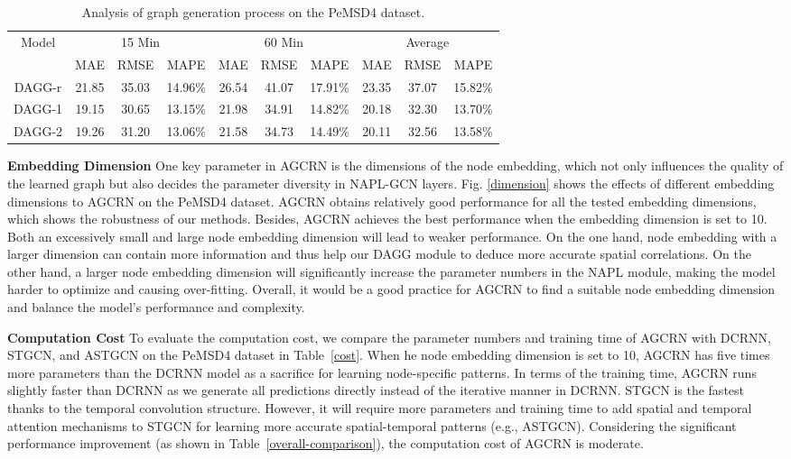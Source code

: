 \documentclass{article}
\begin{document}
\begin{table}[h]
\centering
\caption{Analysis of graph generation process on the PeMSD4 dataset. }
\label{graph-generation}
\begin{tabular}{@{}cccccccccc@{}}
\toprule
\multirow{2}{*}{Model} & \multicolumn{3}{c}{15 Min} & \multicolumn{3}{c}{60 Min} & \multicolumn{3}{c}{Average} \\ \cmidrule(l){2-10} 
                       & MAE    & RMSE   & MAPE     & MAE    & RMSE   & MAPE     & MAE     & RMSE   & MAPE     \\ \midrule
DAGG-r                 & 21.85  & 35.03  & 14.96\%  & 26.54  & 41.07  & 17.91\%  & 23.35   & 37.07  & 15.82\%  \\ \midrule
DAGG-1                 & 19.15  & 30.65  & 13.15\%  & 21.98  & 34.91  & 14.82\%  & 20.18   & 32.30  & 13.70\%  \\ \midrule
DAGG-2                 & 19.26  & 31.20  & 13.06\%  & 21.58  & 34.73  & 14.49\%  & 20.11   & 32.56  & 13.58\%  \\ \bottomrule
\end{tabular}
\end{table}

\textbf{Embedding Dimension} One key parameter in AGCRN is the dimensions of the node embedding, which not only influences the quality of the learned graph but also decides the parameter diversity in NAPL-GCN layers. Fig. \ref{dimension} shows the effects of different embedding dimensions to AGCRN on the PeMSD4 dataset. AGCRN obtains relatively good performance for all the tested embedding dimensions, which shows the robustness of our methods. Besides, AGCRN achieves the best performance when the embedding dimension is set to 10. Both an excessively small and large node embedding dimension will lead to weaker performance. On the one hand, node embedding with a larger dimension can contain more information and thus help our DAGG module to deduce more accurate spatial correlations. On the other hand, a larger node embedding dimension will significantly increase the parameter numbers in the NAPL module, making the model harder to optimize and causing over-fitting. Overall, it would be a  good practice for AGCRN to find a suitable node embedding dimension and balance the model's performance and complexity.

\textbf{Computation Cost}
To evaluate the computation cost, we compare the parameter numbers and training time of AGCRN with DCRNN, STGCN, and ASTGCN on the PeMSD4 dataset in Table~\ref{cost}. When he node embedding dimension is set to 10, AGCRN has five times more parameters than the DCRNN model as a sacrifice for learning node-specific patterns. In terms of the training time, AGCRN runs slightly faster than DCRNN as we generate all predictions directly instead of the iterative manner in DCRNN. STGCN is the fastest thanks to the temporal convolution structure. However, it will require more parameters and training time to add spatial and temporal attention mechanisms to STGCN for learning more accurate spatial-temporal patterns (e.g., ASTGCN). Considering the significant performance improvement (as shown in Table~\ref{overall-comparison}), the computation cost of AGCRN is moderate. 
\end{document}
